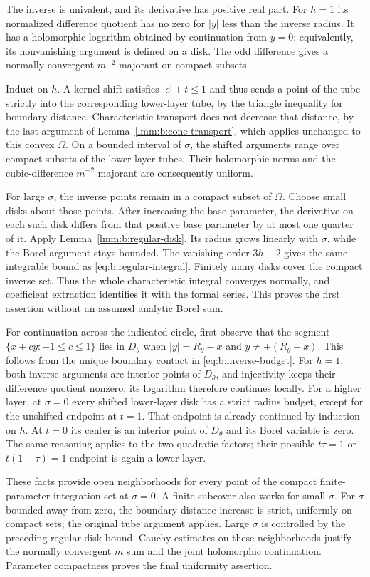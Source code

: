 \begin{prf}
The inverse is univalent, and its derivative has positive real part.
For $h=1$ its normalized difference quotient has no zero for
$|y|$ less than the inverse radius. It has a holomorphic logarithm
obtained by continuation from $y=0$; equivalently, its nonvanishing
argument is defined on a disk. The odd difference gives a normally
convergent $m^{-2}$ majorant on compact subsets.

Induct on $h$. A kernel shift satisfies $|c|+t\leq1$ and thus
sends a point of the tube strictly into the corresponding
lower-layer tube, by the triangle inequality for boundary distance.
Characteristic transport does not decrease that distance, by the
last argument of Lemma~\ref{lmm:b:cone-transport}, which applies
unchanged to this convex $\Omega$. On a bounded interval of
$\sigma$, the shifted arguments range over compact subsets of the
lower-layer tubes. Their holomorphic norms and the cubic-difference
$m^{-2}$ majorant are consequently uniform.

For large $\sigma$, the inverse points remain in a compact subset
of $\Omega$. Choose small disks about those points. After increasing
the base parameter, the derivative on each such disk differs from
that positive base parameter by at most one quarter of it. Apply
Lemma~\ref{lmm:b:regular-disk}. Its radius grows linearly with
$\sigma$, while the Borel argument stays bounded. The vanishing
order $3h-2$ gives the same integrable bound as
\eqref{eq:b:regular-integral}. Finitely many disks cover the compact
inverse set. Thus the whole characteristic integral converges
normally, and coefficient extraction identifies it with the formal
series. This proves the first assertion without an assumed analytic
Borel sum.

For continuation across the indicated circle, first observe that
the segment $\{x+c y:-1\leq c\leq1\}$ lies in $D_\theta$
when $|y|=R_\theta-x$ and $y\ne\pm(R_\theta-x)$.
This follows from the unique boundary contact in
\eqref{eq:b:inverse-budget}. For $h=1$, both inverse arguments
are interior points of $D_\theta$, and injectivity keeps their
difference quotient nonzero; its logarithm therefore continues
locally. For a higher layer, at $\sigma=0$ every shifted
lower-layer disk has a strict radius budget, except for the
unshifted endpoint at $t=1$. That endpoint is already continued
by induction on $h$. At $t=0$ its center is an interior point of
$D_\theta$ and its Borel variable is zero. The same reasoning
applies to the two quadratic factors; their possible $t\tau=1$
or $t(1-\tau)=1$ endpoint is again a lower layer.

These facts provide open neighborhoods for every point of the compact
finite-parameter integration set at $\sigma=0$. A finite subcover
also works for small $\sigma$. For $\sigma$ bounded away from zero,
the boundary-distance increase is strict, uniformly on compact
sets; the original tube argument applies. Large $\sigma$ is
controlled by the preceding regular-disk bound. Cauchy estimates on
these neighborhoods justify the normally convergent $m$ sum and
the joint holomorphic continuation. Parameter compactness proves
the final uniformity assertion.
\end{prf}

